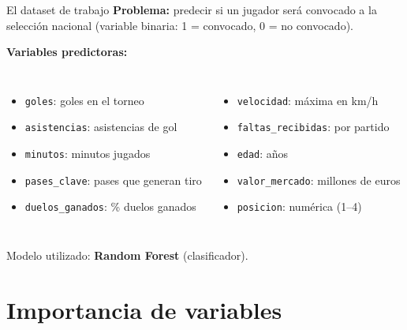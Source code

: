 \documentclass[aspectratio=169]{beamer}
\begin{document}
\begin{frame}{El dataset de trabajo}
  \textbf{Problema:} predecir si un jugador será convocado a la selección nacional (variable binaria: 1 = convocado, 0 = no convocado).

  \bigskip
  \textbf{Variables predictoras:}
  \begin{columns}
      \begin{itemize}
        \item \texttt{goles}: goles en el torneo
        \item \texttt{asistencias}: asistencias de gol
        \item \texttt{minutos}: minutos jugados
        \item \texttt{pases\_clave}: pases que generan tiro
        \item \texttt{duelos\_ganados}: \% duelos ganados
      \end{itemize}
      \begin{itemize}
        \item \texttt{velocidad}: máxima en km/h
        \item \texttt{faltas\_recibidas}: por partido
        \item \texttt{edad}: años
        \item \texttt{valor\_mercado}: millones de euros
        \item \texttt{posicion}: numérica (1--4)
      \end{itemize}
  \end{columns}

  \bigskip
  Modelo utilizado: \textbf{Random Forest} (clasificador).
\end{frame}

\section{Importancia de variables}
\end{document}
